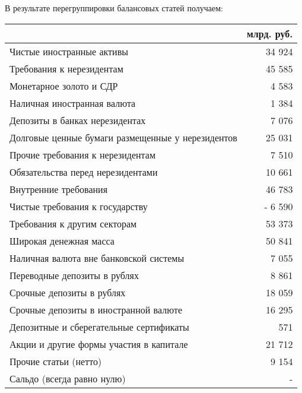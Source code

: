 \documentclass[12pt, table]{exam}
\begin{document}
\begin{questions}
\pagebreak
\begin{solution}[6em] В результате перегруппировки балансовых статей получаем:
	
\small
\begin{tabularx}{\linewidth}[b]{@{}>{\raggedright\arraybackslash}Xr@{}}
	                                                  & млрд. руб. \\ \toprule
	Чистые иностранные активы                         & 34 924     \\ \midrule
	Требования к нерезидентам                         & 45 585     \\
	Монетарное золото и СДР                           & 4 583      \\
	Наличная иностранная валюта                       & 1 384      \\
	Депозиты в банках нерезидентах                    & 7 076      \\
	Долговые ценные бумаги размещенные у нерезидентов & 25 031     \\
	Прочие требования к нерезидентам                  & 7 510      \\
	Обязательства перед нерезидентами                 & 10 661     \\ \midrule
	Внутренние требования                             & 46 783     \\
	Чистые требования к государству                   & -   6 590  \\
	Требования к другим секторам                      & 53 373     \\ \midrule
	Широкая денежная масса                            & 50 841     \\
	Наличная валюта вне банковской системы            & 7 055      \\
	Переводные депозиты в рублях                      & 8 861      \\
	Срочные депозиты в рублях                         & 18 059     \\
	Срочные депозиты в иностранной валюте             & 16 295     \\
	Депозитные и сберегательные сертификаты           & 571        \\ \midrule
	Акции и другие формы участия в капитале           & 21 712     \\ \midrule
	Прочие статьи (нетто)                             & 9 154      \\ \midrule
	Сальдо (всегда равно нулю)                        & -          \\ \bottomrule
\end{tabularx}%
\normalsize
	

\end{solution}
\end{questions}
\end{document}
